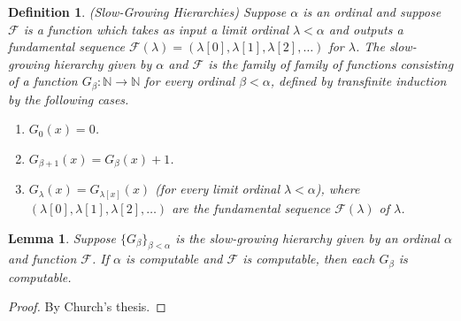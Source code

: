 \documentclass{article}
\newtheorem{definition}[theorem]{Definition}
\newtheorem{lemma}[theorem]{Lemma}
\begin{document}
\begin{definition}
\label{slowgrowinghierarchiesdefn}
    (Slow-Growing Hierarchies)
    Suppose $\alpha$ is an ordinal and suppose $\mathcal F$ is a function which
    takes as input a limit ordinal $\lambda<\alpha$ and outputs a fundamental
    sequence $\mathcal F(\lambda)=(\lambda[0],\lambda[1],\lambda[2],\ldots)$
    for $\lambda$. The \emph{slow-growing hierarchy given by $\alpha$ and $\mathcal F$}
    is the family of family of functions consisting of a function
    $G_\beta:\mathbb N\to\mathbb N$ for every
    ordinal $\beta<\alpha$, defined by transfinite induction by the following cases.
    \begin{enumerate}
        \item
        $G_0(x)=0$.
        \item
        $G_{\beta+1}(x) = G_\beta(x) + 1$.
        \item
        $G_{\lambda}(x) = G_{\lambda[x]}(x)$ (for every limit ordinal $\lambda<\alpha$),
        where $(\lambda[0],\lambda[1],\lambda[2],\ldots)$ are the fundamental sequence
        $\mathcal F(\lambda)$ of $\lambda$.
    \end{enumerate}
\end{definition}

\begin{lemma}
    Suppose $\{G_\beta\}_{\beta<\alpha}$ is the slow-growing hierarchy given by
    an ordinal $\alpha$ and function $\mathcal F$.
    If $\alpha$ is computable and $\mathcal F$ is computable,
    then each $G_\beta$ is computable.
\end{lemma}

\begin{proof}
By Church's thesis.
\end{proof}
\end{document}
